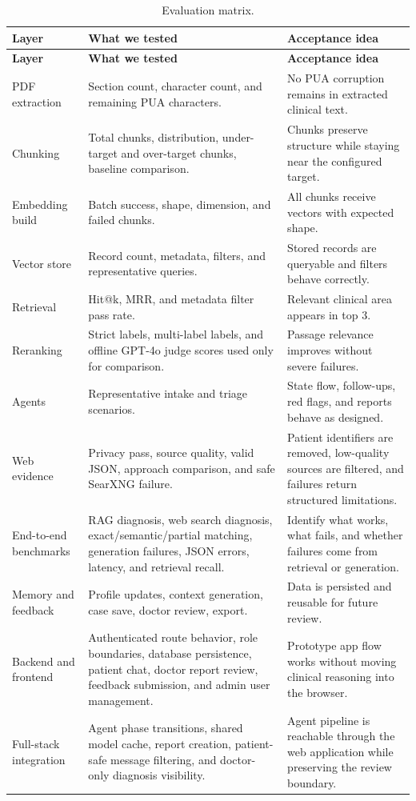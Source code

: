 \begin{longtable}{p{} p{} p{}}
\caption{Evaluation matrix.}
\label{tab:evaluation_matrix}\\
\toprule
\textbf{Layer} & \textbf{What we tested} & \textbf{Acceptance idea}\\
\midrule
\endfirsthead
\toprule
\textbf{Layer} & \textbf{What we tested} & \textbf{Acceptance idea}\\
\midrule
\endhead
PDF extraction & Section count, character count, and remaining PUA characters. & No PUA corruption remains in extracted clinical text.\\
Chunking & Total chunks, distribution, under-target and over-target chunks, baseline comparison. & Chunks preserve structure while staying near the configured target.\\
Embedding build & Batch success, shape, dimension, and failed chunks. & All chunks receive vectors with expected shape.\\
Vector store & Record count, metadata, filters, and representative queries. & Stored records are queryable and filters behave correctly.\\
Retrieval & Hit@k, MRR, and metadata filter pass rate. & Relevant clinical area appears in top 3.\\
Reranking & Strict labels, multi-label labels, and offline GPT-4o judge scores used only for comparison. & Passage relevance improves without severe failures.\\
Agents & Representative intake and triage scenarios. & State flow, follow-ups, red flags, and reports behave as designed.\\
Web evidence & Privacy pass, source quality, valid JSON, approach comparison, and safe SearXNG failure. & Patient identifiers are removed, low-quality sources are filtered, and failures return structured limitations.\\
End-to-end benchmarks & RAG diagnosis, web search diagnosis, exact/semantic/partial matching, generation failures, JSON errors, latency, and retrieval recall. & Identify what works, what fails, and whether failures come from retrieval or generation.\\
Memory and feedback & Profile updates, context generation, case save, doctor review, export. & Data is persisted and reusable for future review.\\
Backend and frontend & Authenticated route behavior, role boundaries, database persistence, patient chat, doctor report review, feedback submission, and admin user management. & Prototype app flow works without moving clinical reasoning into the browser.\\
Full-stack integration & Agent phase transitions, shared model cache, report creation, patient-safe message filtering, and doctor-only diagnosis visibility. & Agent pipeline is reachable through the web application while preserving the review boundary.\\
\bottomrule
\end{longtable}

